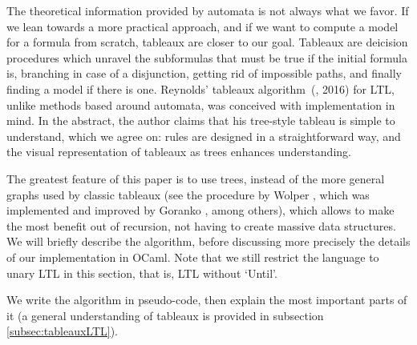 \documentclass[11pt]{article}
\theoremstyle{definition}
\begin{document}
The theoretical information provided by automata is not always what we favor. If we lean towards a more practical approach, and if we want
to compute a model for a formula from scratch, tableaux are closer to our goal. Tableaux are deicision procedures which
unravel the subformulas that
must be true if the initial formula is, branching in case of a disjunction, getting rid of impossible paths, and finally finding
a model if there is one.
Reynolds' tableaux algorithm~(\cite{ReyLTL}, 2016) 
for LTL, unlike methods based around automata, was conceived
with implementation in mind. In the abstract, the author claims that his tree-style tableau is simple to understand, which we agree on:
 rules are designed in a straightforward way, and the visual representation of tableaux as trees enhances understanding.

The greatest feature of this paper is to use trees, instead of the more general graphs used by classic tableaux (see the procedure by Wolper
\cite{WolperTabl}, which was implemented and improved
by Goranko \cite{GorankoTabl}, among others), which allows to
make the most benefit out of recursion, not having to create massive data structures. We will briefly describe the algorithm, before discussing
more precisely the details of our implementation in OCaml. Note that we still restrict the language to unary LTL in this section,
that is, LTL without `Until'.

We write the algorithm in pseudo-code, then explain the most important parts of it (a general understanding of tableaux is provided in subsection
\ref*{subsec:tableauxLTL}).\\
\end{document}
